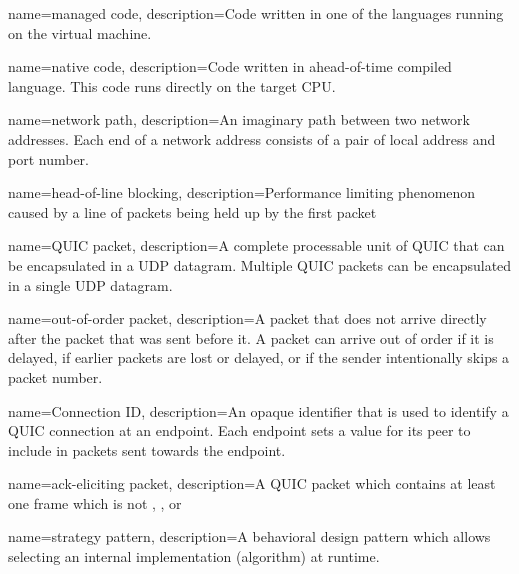 \makeglossaries

\renewcommand{\glsnamefont}[1]{\capitalisewords{#1}}

\newcommand{\newdefinedabbreviation}[4]{
    \newglossaryentry{#1}
    {
        text={#2},
        long={#3},
        name={#3 (#2)},
        first={#3 (#2)},
        firstplural={\glsentrylong{#1}\glspluralsuffix (\glsentryname{#1}\glspluralsuffix )},
        description={#4}
    }
}

{
  name=managed code,
  description={Code written in one of the \dotnet{} languages running on the \dotnet{} virtual machine.}
}

{
  name=native code,
  description={Code written in ahead-of-time compiled language. This code runs directly on the target CPU.}
}

{
    name=network path,
    description={An imaginary path between two network addresses. Each end of a network address consists of a pair of local address and port number.}
}

{
    name=head-of-line blocking,
    description={Performance limiting phenomenon caused by a line of packets being held up by the first packet}
}

{
    name=QUIC packet,
    description={A complete processable unit of QUIC that can be encapsulated in a UDP datagram.
Multiple QUIC packets can be encapsulated in a single UDP datagram.}
}

{
  name=out-of-order packet,
  description={A packet that does not arrive directly after the packet that was
  sent before it.  A packet can arrive out of order if it is delayed, if earlier packets are
  lost or delayed, or if the sender intentionally skips a packet number.}
}

{
  name=Connection ID,
  description={An opaque identifier that is used to identify a QUIC
  connection at an endpoint.  Each endpoint sets a value for its
  peer to include in packets sent towards the endpoint.}
}

{
  name=ack-eliciting packet,
  description={A QUIC packet which contains at least one frame which is not \PADDING{},  \ACK{}, or \CONNECTIONCLOSE{}}
}

{
  name=strategy pattern,
  description={A behavioral design pattern which allows selecting an internal implementation (algorithm) at runtime.}
}

